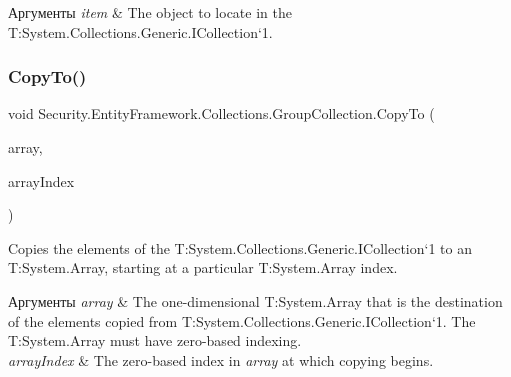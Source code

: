 \begin{DoxyParams}{Аргументы}
{\em item} & The object to locate in the T\+:\+System.\+Collections.\+Generic.\+I\+Collection`1.\\
\hline
\end{DoxyParams}
\mbox{\label{class_security_1_1_entity_framework_1_1_collections_1_1_group_collection_a1b2ecb7b735f0a92c3911e81a868ac8b}} 
\subsubsection{\texorpdfstring{Copy\+To()}{CopyTo()}}
{\footnotesize\ttfamily void Security.\+Entity\+Framework.\+Collections.\+Group\+Collection.\+Copy\+To (\begin{DoxyParamCaption}\item[{\hyperlink{interface_security_1_1_interfaces_1_1_model_1_1_i_group}{I\+Group} \mbox{[}$\,$\mbox{]}}]{array,  }\item[{int}]{array\+Index }\end{DoxyParamCaption})}



Copies the elements of the T\+:\+System.\+Collections.\+Generic.\+I\+Collection`1 to an T\+:\+System.\+Array, starting at a particular T\+:\+System.\+Array index. 


\begin{DoxyParams}{Аргументы}
{\em array} & The one-\/dimensional T\+:\+System.\+Array that is the destination of the elements copied from T\+:\+System.\+Collections.\+Generic.\+I\+Collection`1. The T\+:\+System.\+Array must have zero-\/based indexing.\\
\hline
{\em array\+Index} & The zero-\/based index in {\itshape array}  at which copying begins.\\
\hline
\end{DoxyParams}

